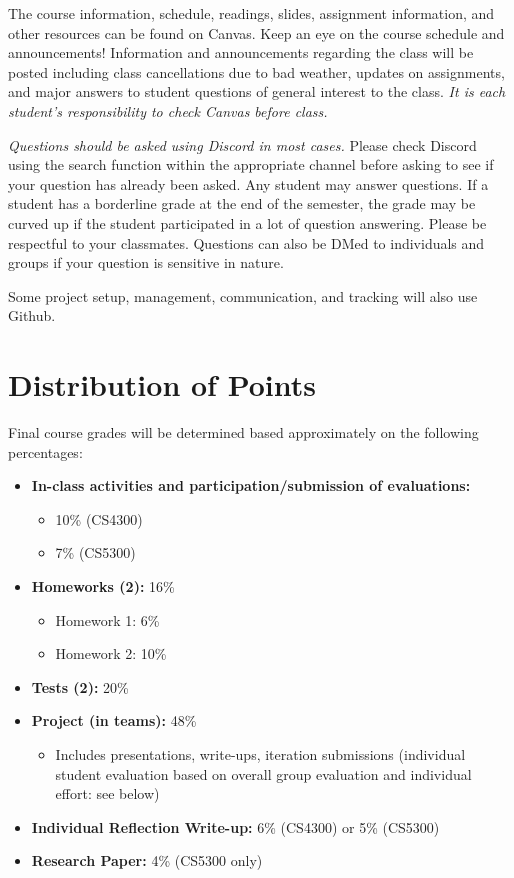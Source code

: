 \documentclass[11pt]{article}
\begin{document}
The course information, schedule, readings, slides, assignment information, and other resources can be found on Canvas. Keep an eye on the course schedule and announcements! Information and announcements regarding the class will be posted including class cancellations due to bad weather, updates on assignments, and major answers to student questions of general interest to the class. \textit{It is each student's responsibility to check Canvas before class.}

\textit{Questions should be asked using Discord in most cases.} Please check Discord using the search function within the appropriate channel before asking to see if your question has already been asked. Any student may answer questions. If a student has a borderline grade at the end of the semester, the grade may be curved up if the student participated in a lot of question answering. Please be respectful to your classmates. Questions can also be DMed to individuals and groups if your question is sensitive in nature.

Some project setup, management, communication, and tracking will also use Github.

\section*{Distribution of Points}

Final course grades will be determined based approximately on the following percentages:

\begin{itemize}
    \item \textbf{In-class activities and participation/submission of evaluations:}
    \begin{itemize}
        \item 10\% (CS4300)
        \item 7\% (CS5300)
    \end{itemize}
    \item \textbf{Homeworks (2):} 16\%
    \begin{itemize}
    \item Homework 1: 6\%
    \item Homework 2: 10\%
    \end{itemize}
    \item \textbf{Tests (2):} 20\%
    \item \textbf{Project (in teams):} 48\%
    \begin{itemize}
        \item Includes presentations, write-ups, iteration submissions (individual student evaluation based on overall group evaluation and individual effort: see below)
    \end{itemize}
    \item \textbf{Individual Reflection Write-up:} 6\% (CS4300) or 5\% (CS5300)
    \item \textbf{Research Paper:} 4\% (CS5300 only)
\end{itemize}
\end{document}
